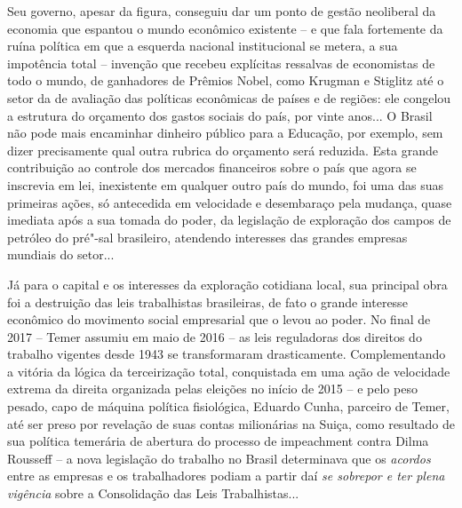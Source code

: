 Seu governo, apesar da figura, conseguiu dar um ponto de gestão
neoliberal da economia que espantou o mundo econômico existente -- e que
fala fortemente da ruína política em que a esquerda nacional
institucional se metera, a sua impotência total -- invenção que recebeu
explícitas ressalvas de economistas de todo o mundo, de ganhadores de
Prêmios Nobel, como Krugman e Stiglitz até o setor da  de avaliação das
políticas econômicas de países e de regiões: ele congelou a estrutura do
orçamento dos gastos sociais do país, por vinte anos... O Brasil não pode
mais encaminhar dinheiro público para a Educação, por exemplo, sem dizer
precisamente qual outra rubrica do orçamento será reduzida. Esta grande
contribuição ao controle dos mercados financeiros sobre o país que agora se inscrevia em
lei, inexistente em qualquer outro país do mundo, foi uma das
suas primeiras ações, só antecedida em velocidade e
desembaraço pela mudança, quase imediata após a sua tomada do poder, da
legislação de exploração dos campos de petróleo do pré"-sal brasileiro,
atendendo interesses das grandes empresas mundiais do setor...

Já para o capital e os interesses da exploração cotidiana local, sua
principal obra foi a destruição das leis trabalhistas brasileiras, de
fato o grande interesse econômico do movimento social empresarial que o
levou ao poder. No final de 2017 -- Temer assumiu em maio de 2016 -- as
leis reguladoras dos direitos do trabalho vigentes desde 1943 se
transformaram drasticamente. Complementando a vitória da lógica da
terceirização total, conquistada em uma ação de velocidade extrema da
direita organizada pelas eleições no início de 2015 -- e pelo peso
pesado, capo de máquina política fisiológica, Eduardo Cunha, parceiro de
Temer, até ser preso por revelação de suas contas milionárias na Suiça,
como resultado de sua política temerária de abertura do processo de
impeachment contra Dilma Rousseff -- a nova legislação do trabalho no
Brasil determinava que os \emph{acordos} entre as empresas e os
trabalhadores podiam a partir daí \emph{se sobrepor e ter plena
vigência} sobre a Consolidação das Leis Trabalhistas...

